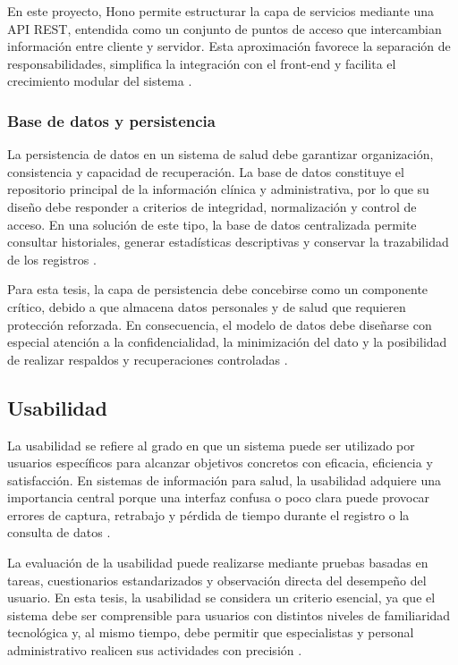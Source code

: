 En este proyecto, Hono permite estructurar la capa de servicios mediante una API REST, entendida como un conjunto de puntos de acceso que intercambian información entre cliente y servidor. Esta aproximación favorece la separación de responsabilidades, simplifica la integración con el front-end y facilita el crecimiento modular del sistema \cite{hono2025docs,owasp2025top10}.

\subsubsection{Base de datos y persistencia}

La persistencia de datos en un sistema de salud debe garantizar organización, consistencia y capacidad de recuperación. La base de datos constituye el repositorio principal de la información clínica y administrativa, por lo que su diseño debe responder a criterios de integridad, normalización y control de acceso. En una solución de este tipo, la base de datos centralizada permite consultar historiales, generar estadísticas descriptivas y conservar la trazabilidad de los registros \cite{who2025his,who2025digitalhealth}.

Para esta tesis, la capa de persistencia debe concebirse como un componente crítico, debido a que almacena datos personales y de salud que requieren protección reforzada. En consecuencia, el modelo de datos debe diseñarse con especial atención a la confidencialidad, la minimización del dato y la posibilidad de realizar respaldos y recuperaciones controladas \cite{mdn2025privacy,mdn2025security}.

\subsection{Usabilidad}

La usabilidad se refiere al grado en que un sistema puede ser utilizado por usuarios específicos para alcanzar objetivos concretos con eficacia, eficiencia y satisfacción. En sistemas de información para salud, la usabilidad adquiere una importancia central porque una interfaz confusa o poco clara puede provocar errores de captura, retrabajo y pérdida de tiempo durante el registro o la consulta de datos \cite{mdn2025accessibility,nextjs2025docs}.

La evaluación de la usabilidad puede realizarse mediante pruebas basadas en tareas, cuestionarios estandarizados y observación directa del desempeño del usuario. En esta tesis, la usabilidad se considera un criterio esencial, ya que el sistema debe ser comprensible para usuarios con distintos niveles de familiaridad tecnológica y, al mismo tiempo, debe permitir que especialistas y personal administrativo realicen sus actividades con precisión \cite{mdn2025accessibility,who2025digitalhealth}.

